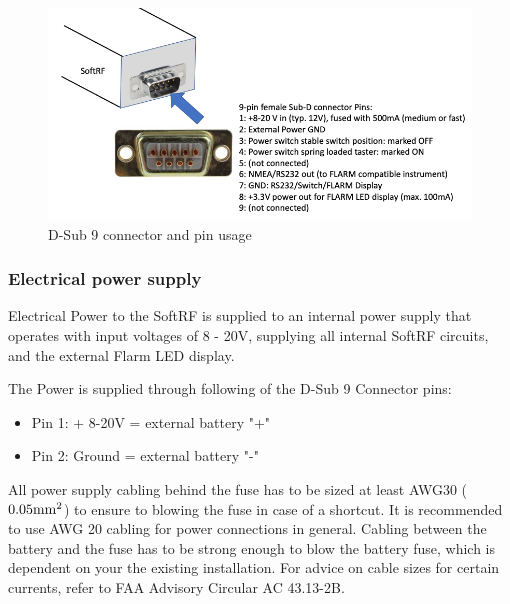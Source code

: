 \documentclass[10pt,a4paper]{article}
\begin{document}
\begin{figure}[h]
\centering
\includegraphics[scale=.5]{d-sub-9.png}
\caption{D-Sub 9 connector and pin usage}\label{d-sub-9}
\end{figure}\FloatBarrier

\subsubsection{Electrical power supply}
Electrical Power to the SoftRF is supplied to an internal power supply that operates with input voltages of 8 - 20V, supplying all internal SoftRF circuits, and the external Flarm LED display.

The Power is supplied through following of the D-Sub 9 Connector pins:

\begin{itemize}
\item Pin 1: + 8-20V = external battery "+"
\item Pin 2: Ground = external battery "-"
\end{itemize}

\begin{center}\end{center}

All power supply cabling behind the fuse has to be sized at least AWG30 ($0.05 {\rm mm}^2$) to ensure to blowing the fuse in case of a shortcut. It is recommended to use AWG 20 cabling for power connections in general. Cabling between the battery and the fuse has to be strong enough to blow the battery fuse, which is dependent on your the existing installation. For advice on cable sizes for certain currents, refer to FAA Advisory Circular AC 43.13-2B.
\end{document}
